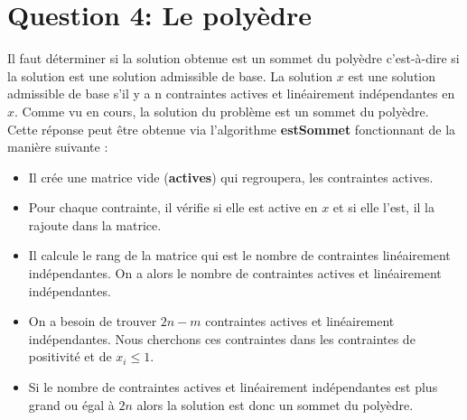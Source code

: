 \documentclass{rapport}
\begin{document}
\section{Question 4: Le polyèdre}
Il faut déterminer si la solution obtenue est un sommet du polyèdre c'est-à-dire si la solution est une solution admissible de base. La solution $x$ est une solution admissible de base s’il y a n contraintes actives et linéairement indépendantes en $x$. Comme vu en cours, la solution du problème est un sommet du polyèdre. Cette réponse peut être obtenue via l’algorithme \textbf{estSommet} fonctionnant de la manière suivante :\\
	
\begin{itemize}
    \item [\textbullet]Il crée une matrice vide ({\bf actives})  qui regroupera, les contraintes actives.
    \item [\textbullet]Pour chaque contrainte, il vérifie si elle est active en $x$ et si elle l’est, il la rajoute dans la matrice.
    \item [\textbullet]Il calcule le rang de la matrice qui est le nombre de contraintes linéairement indépendantes. On a alors le nombre de contraintes actives et linéairement indépendantes. 
    \item [\textbullet]On a besoin de trouver $2n-m$ contraintes actives et linéairement indépendantes. Nous cherchons ces contraintes dans les contraintes de positivité et de $x_i \le 1$.
    \item [\textbullet]Si le nombre de contraintes actives et linéairement indépendantes est plus grand ou égal à $2n$ alors la solution est donc un sommet du polyèdre.
\end{itemize}
\newpage
\end{document}
